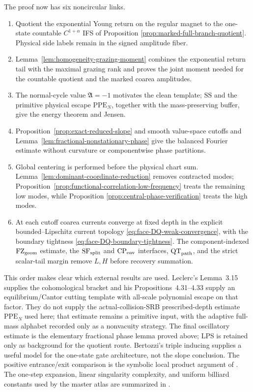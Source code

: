 \documentclass[11pt]{article}
\begin{document}
The proof now has six noncircular links.
\begin{enumerate}[label=\textup{(F\arabic*)}]
\item Quotient the exponential Young return on the regular magnet to the
      one-state countable $C^{1+\alpha}$ IFS of Proposition
      \ref{prop:marked-full-branch-quotient}.  Physical side labels remain
      in the signed amplitude fiber.
\item Lemma~\ref{lem:homogeneity-grazing-moment} combines the exponential
      return tail with the maximal grazing rank and proves the joint moment
      needed for the countable quotient and the marked coarea amplitudes.
\item The normal-cycle value $\mathfrak A=-1$ motivates the clean template;
      $\mathrm{SS}$ and the primitive physical escape
      $\mathrm{PPE}_{N}$, together
      with the mass-preserving buffer, give the energy theorem and Jensen.
\item Proposition~\ref{prop:exact-reduced-slope} and smooth value-space
      cutoffs and Lemma~\ref{lem:fractional-nonstationary-phase} give the
      balanced Fourier estimate without curvature or componentwise phase
      partitions.
\item Global centering is performed before the physical chart sum.
      Lemma~\ref{lem:dominant-coordinate-reduction} removes contracted modes;
      Proposition~\ref{prop:functional-correlation-low-frequency} treats the
      remaining low modes, while Proposition
      \ref{prop:central-phase-verification} treats the high modes.
\item At each cutoff coarea currents converge at fixed depth in the explicit
      bounded--Lipschitz current topology
      \eqref{eq:face-DQ-weak-convergence}, with the boundary tightness
      \eqref{eq:face-DQ-boundary-tightness}.  The
      component-indexed $\mathrm{FZ}_{\rm geom}$ estimate, the
      $\mathrm{SF}_{\rm split}$ and $\mathrm{CP}_{\rm env}$ interfaces,
      $\mathrm{QT}_{\rm path}$, and the strict scalar-tail margin remove
      $L,H$ before recovery summation.
\end{enumerate}

This order makes clear which external results are used.  Leclerc's
Lemma~3.15 supplies the cohomological bracket and his
Propositions~4.31--4.33 supply an equilibrium/Cantor cutting template with
all-scale polynomial escape on that factor.  They do not supply the
actual-collision-SRB prescribed-depth estimate $\mathrm{PPE}_{N}$ used here;
that estimate remains a primitive input, with the adaptive full-mass alphabet
recorded only as a nonvacuity strategy.
The final oscillatory estimate is the elementary fractional phase lemma
proved above; LPS is retained only as background for the quotient route.
Bertozzi's triple inducing supplies a useful model for the one-state gate
architecture, not the slope conclusion.  The positive entrance/exit comparison is the symbolic local
product argument of \cite{ClimenhagaLPS}.  The
one-step expansion, linear singularity complexity, and uniform billiard
constants used by the master atlas are summarized in \cite{DLreview}.
\end{document}
